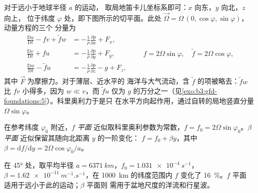 对于远小于地球半径 $a$ 的运动，
取局地笛卡儿坐标系即可：$x$ 向东，$y$ 向北，$z$ 向上，
位于纬度 $\varphi$ 处，即下图所示的切平面。此处
$\vec\Omega = \Omega\,(0, \cos\varphi, \sin\varphi)$，动量方程的三个
分量为
\[
\begin{aligned}
\frac{\mathrm Du}{\mathrm Dt} - f v + \tilde f w &= -\frac{1}{\rho}\frac{\partial p}{\partial x} + F_x ,\\
\frac{\mathrm Dv}{\mathrm Dt} + f u &= -\frac{1}{\rho}\frac{\partial p}{\partial y} + F_y ,\\
\frac{\mathrm Dw}{\mathrm Dt} - \tilde f u &= -\frac{1}{\rho}\frac{\partial p}{\partial z} - g + F_z ,
\end{aligned}
\qquad f = 2\Omega\sin\varphi,\quad \tilde f = 2\Omega\cos\varphi ,
\]
其中 $\vec F$ 为摩擦力。对于薄层、近水平的
海洋与大气流动，含 $\tilde f$ 的项被略去：$\tilde f w$
比 $fv$ 小得多，因为 $w \ll v$，而 $\tilde f u$ 仅为
$g$ 的万分之一（见\cref{exo:b3:gfd-foundations:5}）。科里奥利力于是只
在水平方向起作用，通过自转的局地竖直分量
$\Omega\sin\varphi$。

\begin{definition}\label{def:b3:gfd-foundations:planes}
在参考纬度 $\varphi_0$ 附近，\emph{$f$ 平面}
近似取科里奥利参数为常数，$f = f_0 =
2\Omega\sin\varphi_0$。\emph{$\beta$ 平面}
近似保留其随向北距离 $y$ 的一阶变化：
$f = f_0 + \beta y$，其中 $\beta = \mathrm df/\mathrm dy = 2\Omega
\cos\varphi_0/a$。
\end{definition}

在 \ang{45} 处，取平均半径 $a = \qty{6371}{km}$，$f_0 =
\qty{1.031e-4}{s^{-1}}$，$\beta = \qty{1.62e-11}{m^{-1}.s^{-1}}$，在
\qty{1000}{km} 的纬度范围内 $f$ 变化了 \qty{16}{\percent}。$f$ 平面
适用于远小于此的运动；$\beta$ 平面则
需用于盆地尺度的洋流和行星波。

